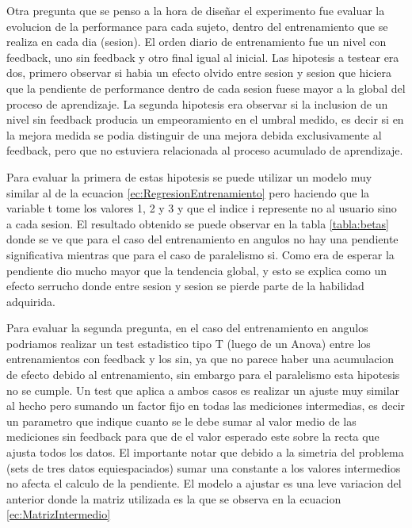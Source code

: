 \documentclass{article}
\begin{document}
Otra pregunta que se penso a la hora de diseñar el experimento fue evaluar la evolucion de la performance para cada sujeto, dentro del entrenamiento que se realiza en cada dia (sesion). El orden diario de entrenamiento fue un nivel con feedback, uno sin feedback y otro final igual al inicial. Las hipotesis a testear era dos, primero observar si habia un efecto olvido entre sesion y sesion que hiciera que la pendiente de performance dentro de cada sesion fuese mayor a la global del proceso de aprendizaje. La segunda hipotesis era observar si la inclusion de un nivel sin feedback producia un empeoramiento en el umbral medido, es decir si en la mejora medida se podia distinguir de una mejora debida exclusivamente al feedback, pero que no estuviera relacionada al proceso acumulado de aprendizaje. 

Para evaluar la primera de estas hipotesis se puede utilizar un modelo muy similar al de la ecuacion \ref{ec:RegresionEntrenamiento} pero haciendo que la variable t tome los valores 1, 2 y 3 y que el indice i represente no al usuario sino a cada sesion. El resultado obtenido se puede observar en la tabla \ref{tabla:betas} donde se ve que para el caso del entrenamiento en angulos no hay una pendiente significativa mientras que para el caso de paralelismo si. Como era de esperar la pendiente dio mucho mayor que la tendencia global, y esto se explica como un efecto serrucho donde entre sesion y sesion se pierde parte de la habilidad adquirida. 

Para evaluar la segunda pregunta, en el caso del entrenamiento en angulos podriamos realizar un test estadistico tipo T (luego de un Anova) entre los entrenamientos con feedback y los sin, ya que no parece haber una acumulacion de efecto debido al entrenamiento, sin embargo para el paralelismo esta hipotesis no se cumple. Un test que aplica a ambos casos es realizar un ajuste muy similar al hecho pero sumando un factor fijo en todas las mediciones intermedias, es decir un parametro que indique cuanto se le debe sumar al valor medio de las mediciones sin feedback para que de el valor esperado este sobre la recta que ajusta todos los datos. El importante notar que debido a la simetria del problema (sets de tres datos equiespaciados) sumar una constante a los valores intermedios no afecta el calculo de la pendiente. El modelo a ajustar es una leve variacion del anterior donde la matriz utilizada es la que se observa en la ecuacion \ref{ec:MatrizIntermedio}
\end{document}
